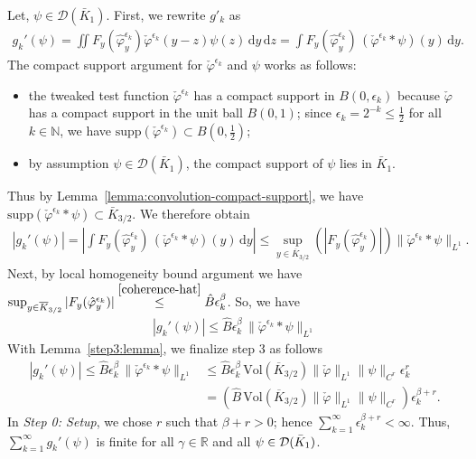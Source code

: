 Let, \(\psi \in \mathcal{D}(\bar K_1)\). First, we rewrite \(g'_k\) as 
\begin{align}\label{gk-formular}
    g_k'(\psi) = \iint F_y(\hat{\varphi}^{\epsilon_k}_{y}) \check \varphi^{\epsilon_k}(y-z) \psi(z) \, \mathrm{d}y \, \mathrm{d}z = \int F_y(\hat \varphi^{\epsilon_k}_y) \, (\check \varphi^{\epsilon_k} * \psi)(y) \, \mathrm{d}y.
\end{align}
The compact support argument for \(\check \varphi^{\epsilon_k}\) and \(\psi\) works as follows: 
\begin{itemize}
    \item the tweaked test function \(\check \varphi^{\epsilon_k}\) has a compact support in \(B(0, \epsilon_k)\) because \(\check \varphi\) has a compact support in the unit ball \(B(0,1)\); since \(\epsilon_k = 2^{-k} \leq \frac{1}{2}\) for all \(k \in \mathbb{N}\), we have \(\mathrm{supp} \left( \check \varphi^{\epsilon_k} \right) \subset B(0,\frac{1}{2})\);
    \item by assumption \(\psi \in \mathcal{D}(\bar K_1)\), the compact support of \(\psi\) lies in \(\bar K_1\).
\end{itemize}
Thus by Lemma~\ref{lemma:convolution-compact-support}, we have \(\mathrm{supp} \left( \check \varphi^{\epsilon_k} * \psi \right) \subset \bar K_{3/2}\). We therefore obtain 
\begin{align*}
    |g_k'(\psi)| = \left|\int F_y(\hat \varphi^{\epsilon_k}_y) \, (\check \varphi^{\epsilon_k} * \psi)(y) \, \mathrm{d}y\right| 
    \leq \sup_{y \in \overline K_{3/2}} \left(|F_y(\hat \varphi^{\epsilon_k}_y)| \right) \lVert \check \varphi^{\epsilon_k} * \psi \rVert_{L^1}.
\end{align*}
Next, by {local homogeneity bound} argument we have \(
    \sup_{y \in \overline K_{3/2}} |F_y(\hat \varphi^{\epsilon_k}_y)|  \overset{\eqref{coherence-hat}}{\leq}  \hat B \epsilon_k^\beta
\). 
So, we have 
\begin{align*}
    |g_k'(\psi)| \leq \hat B \epsilon_k^\beta \, \lVert \check \varphi^{\epsilon_k} * \psi \rVert_{L^1}
\end{align*}
With Lemma~\ref{step3:lemma}, we finalize step 3 as follows 
\begin{align}
    |g_k'(\psi)| \leq \hat B \epsilon_k^\beta \, \lVert \check \varphi^{\epsilon_k} * \psi \rVert_{L^1} &\leq \hat B \epsilon_k^\beta \,  \mathrm{Vol}(\overline K_{3/2})  \lVert \check \varphi \rVert_{L^1} \lVert \psi \rVert_{C^r} \epsilon^r_k \nonumber \\
    &= \left( \hat B \, \mathrm{Vol}(\overline K_{3/2})  \lVert \check \varphi \rVert_{L^1} \lVert \psi \rVert_{C^r} \right)\epsilon^{\beta + r}_k. \label{Mustermkatze}
\end{align}
In \emph{Step 0: Setup}, we chose \(r\) such that  \(\beta + r > 0\); hence \(\sum_{k=1}^\infty \epsilon_k^{\beta + r} < \infty\). Thus, \(\sum^\infty_{k=1} g_k'(\psi)\) is finite for all \(\gamma \in \mathbb{R}\) and all \(\psi \in \mathcal{D}(\bar{K}_{1})\).

